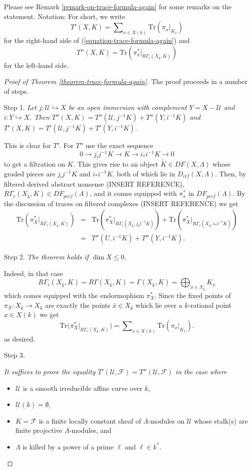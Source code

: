 \documentclass{stacks-project}
\theoremstyle{plain}
\theoremstyle{definition}
\theoremstyle{remark}
\numberwithin{equation}{subsection}
\begin{document}
\noindent
Please see Remark \ref{remark-on-trace-formula-again} for some remarks
on the statement. Notation: For short, we write
$$
T'(X, K) =
\sum\nolimits_{x\in X(k)}
\text{Tr}(\pi_x |_{K_{\bar x}})
$$
for the right-hand side of (\ref{equation-trace-formula-again}) and
$$
T''(X, K)
=\text{Tr}(\pi_x^* |_{R\Gamma_c(X_{\bar k}, K)})
$$
for the left-hand side.

\begin{proof}[Proof of Theorem \ref{theorem-trace-formula-again}]
The proof proceeds in a number of steps.

\medskip\noindent
Step 1. {\it Let $j : \mathcal{U}\hookrightarrow X$ be an open immersion with
complement $Y = X - \mathcal{U}$ and $i : Y \hookrightarrow X$. Then
$T''(X, K) = T''(\mathcal{U}, j^{-1} K)+ T''(Y, i^{-1}K)$ and
$T'(X, K) = T'(\mathcal{U}, j^{-1} K)+ T'(Y, i^{-1}K)$.}

\medskip\noindent
This is clear for $T'$. For $T''$ use the exact sequence
$$
0\to j_!j^{-1} K \to K \to i_* i^{-1} K \to 0
$$
to get a filtration on $K$. This gives rise to an object
$\widetilde K \in DF(X, \Lambda)$
whose graded pieces are $j_!j^{-1}K$ and $i_*i^{-1}K$,
both of which lie in $D_{ctf}(X, \Lambda)$. Then, by filtered derived
abstract nonsense (INSERT REFERENCE),
$R\Gamma_c(X_{\bar k}, K)\in DF_{perf}(\Lambda)$,
and it comes equipped with $\pi_x^*$ in
$DF_{perf}(\Lambda)$.
By the discussion of traces on filtered complexes (INSERT REFERENCE) we get
\begin{eqnarray*}
\text{Tr}(\pi_X^* |_{R\Gamma_c(X_{\bar k}, K)})
& = & \text{Tr}(\pi_X^* |_{R\Gamma_c(X_{\bar k}, j_!j^{-1}K)}) +
\text{Tr}(\pi_X^* |_{R\Gamma_c(X_{\bar k}, i_*i^{-1}K)}) \\
& = & T''(U, i^{-1}K) + T''(Y, i^{-1}K).
\end{eqnarray*}

\noindent
Step 2. {\it The theorem holds if $\dim X\leq 0$. }

\medskip\noindent
Indeed, in that case
$$
R\Gamma_c(X_{\bar k}, K) = R\Gamma(X_{\bar k}, K) = \Gamma(X_{\bar k}, K) =
\bigoplus\nolimits_{\bar x \in X_{\bar k}} K_{\bar x}
$$
which comes equipped with the endormophism $\pi_X^*$.
Since the fixed points of $\pi_X : X_{\bar k}\to X_{\bar k}$ are exactly the
points $\bar x \in X_{\bar k}$ which lie over a $k$-rational point $x \in X(k)$
we get
$$
\text{Tr}\big(\pi_X^*|_{R\Gamma_c(X_{\bar k}, K)}\big) =
\sum\nolimits_{x \in X(k)} \text{Tr}(\pi_x|_{K_{\bar x}}).
$$
as desired.

\medskip\noindent
Step 3. {\it It suffices to prove the equality
$T'(\mathcal{U}, \mathcal{F}) = T''(\mathcal{U}, \mathcal{F})$
in the case where
\begin{itemize}
\item $\mathcal{U}$ is a smooth irreducible affine curve over $k$,
\item $\mathcal{U}(k) = \emptyset$,
\item $K=\mathcal{F}$ is a finite locally constant sheaf of $\Lambda$-modules
on $\mathcal{U}$ whose stalk(s) are finite projective $\Lambda$-modules, and
\item $\Lambda$ is killed by a power of a prime $\ell$ and $\ell \in k^*$.
\end{itemize}
}


\end{proof}
\end{document}

